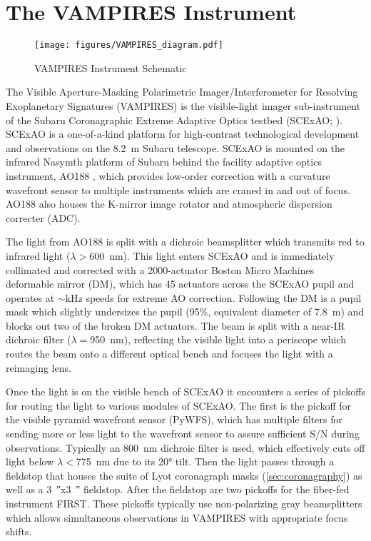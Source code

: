 \section{The VAMPIRES Instrument}\label{sec:design}

\begin{figure*}[t]
    \centering
    \texttt{[image: figures/VAMPIRES\_diagram.pdf]}
    \caption{VAMPIRES Instrument Schematic}
    \label{fig:schematic}
\end{figure*}

The Visible Aperture-Masking Polarimetric Imager/Interferometer for Resolving Exoplanetary Signatures (VAMPIRES) is the visible-light imager sub-instrument of the Subaru Coronagraphic Extreme Adaptive Optics testbed (SCExAO; \citet{jovanovic_subaru_2015}). SCExAO is a one-of-a-kind platform for high-contrast technological development and observations on the \SI{8.2}{\meter} Subaru telescope. SCExAO is mounted on the infrared Nasymth platform of Subaru behind the facility adaptive optics instrument, AO188 \citep{minowa_performance_2010}, which provides low-order correction with a curvature wavefront sensor to multiple instruments which are craned in and out of focus. AO188 also houses the K-mirror image rotator and atmospheric dispersion correcter (ADC).

The light from AO188 is split with a dichroic beamsplitter which transmits red to infrared light ($\lambda >$\SI{600}{\nano\meter}). This light enters SCExAO and is immediately collimated and corrected with a 2000-actuator Boston Micro Machines deformable mirror (DM), which has 45 actuators across the SCExAO pupil and operates at $\sim$\si{\kilo\hertz} speeds for extreme AO correction. Following the DM is a pupil mask which slightly undersizes the pupil (95\%, equivalent diameter of \SI{7.8}{\meter}) and blocks out two of the broken DM actuators. The beam is split with a near-IR dichroic filter ($\lambda=$\SI{950}{\nano\meter}), reflecting the visible light into a periscope which routes the beam onto a different optical bench and focuses the light with a reimaging lens.

Once the light is on the visible bench of SCExAO it encounters a series of pickoffs for routing the light to various modules of SCExAO. The first is the pickoff for the visible pyramid wavefront sensor (PyWFS), which has multiple filters for sending more or less light to the wavefront sensor to assure sufficient S/N during observations. Typically an \SI{800}{\nano\meter} dichroic filter is used, which effectively cuts off light below $\lambda <$\SI{775}{\nano\meter} due to its \ang{20} tilt. Then the light passes through a fieldstop that houses the suite of Lyot coronagraph masks (\autoref{sec:coronagraphy}) as well as a \SI{3}{\arcsecond}x\SI{3}{\arcsecond} fieldstop. After the fieldstop are two pickoffs for the fiber-fed instrument FIRST. These pickoffs typically use non-polarizing gray beamsplitters which allows simultaneous observations in VAMPIRES with appropriate focus shifts.

